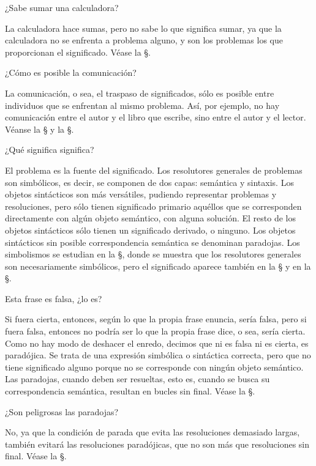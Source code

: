 \Q ¿Sabe sumar una calculadora?

La calculadora hace sumas, pero no sabe lo que significa sumar, ya que la
calculadora no se enfrenta a problema alguno, y son los problemas los que
proporcionan el significado.  Véase la \S{}.

\Q ¿Cómo es posible la comunicación?

La comunicación, o sea, el traspaso de significados, sólo es posible entre
individuos que se enfrentan al mismo problema.  Así, por ejemplo, no hay
comunicación entre el autor y el libro que escribe, sino entre el autor y el
lector.  Véanse la \S{} y la \S{}.

\Q ¿Qué significa significa?

El problema es la fuente del significado.  Los resolutores generales de
problemas son simbólicos, es decir, se componen de dos capas: semántica y
sintaxis.  Los objetos sintácticos son más versátiles, pudiendo representar
problemas y resoluciones, pero sólo tienen significado primario aquéllos que
se corresponden directamente con algún objeto semántico, con alguna
solución.  El resto de los objetos sintácticos sólo tienen un significado
derivado, o ninguno.  Los objetos sintácticos sin posible correspondencia
semántica se denominan paradojas.  Los simbolismos se estudian en la
\S{}, donde se muestra que los resolutores generales son
necesariamente simbólicos, pero el significado aparece también en la
\S{} y en la \S{}.

\Q Esta frase es falsa, ¿lo es?

Si fuera cierta, entonces, según lo que la propia frase enuncia, sería
falsa, pero si fuera falsa, entonces no podría ser lo que la propia frase
dice, o sea, sería cierta.  Como no hay modo de deshacer el enredo, decimos
que ni es falsa ni es cierta, es paradójica.  Se trata de una expresión
simbólica o sintáctica correcta, pero que no tiene significado alguno porque
no se corresponde con ningún objeto semántico. Las paradojas, cuando deben
ser resueltas, esto es, cuando se busca su correspondencia semántica,
resultan en bucles sin final. Véase la \S{}.

\Q ¿Son peligrosas las paradojas?

No, ya que la condición de parada que evita las resoluciones demasiado
largas, también evitará las resoluciones paradójicas, que no son más que
resoluciones sin final.  Véase la \S{}.

